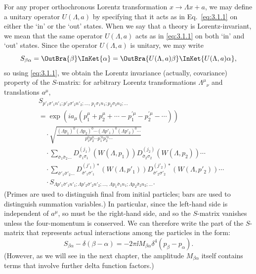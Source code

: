For any proper orthochronous Lorentz transformation $x\to\Lambda x+a$, we may
define a unitary operator $U(\Lambda,a)$ by specifying that it acts as in
Eq.~\eqref{eq:3.1.1} on either the `in' or the `out' states. When we say that a theory is
Lorentz-invariant, we mean that the same operator $U(\Lambda,a)$ acts as in
\eqref{eq:3.1.1} on both `in' and `out' states. Since the operator $U(\Lambda,a)$ is
unitary, we may write
\[
S_{\beta\alpha}=\OutBra{\beta}\InKet{\alpha}
=\OutBra{U(\Lambda,a)\beta}\InKet{U(\Lambda,a)\alpha},
\]
so using \eqref{eq:3.1.1}, we obtain the Lorentz invariance (actually, covariance)
property of the $S$-matrix: for arbitrary Lorentz transformations
$\Lambda^\mu{}_{\nu}$ and translations $a^\mu$,
\begin{align}
&S_{p'_1\sigma'_1n'_1;p'_2\sigma'_2n'_2;\ldots,\,
p_1\sigma_1n_1;p_2\sigma_2n_2;\ldots}
\nonumber\\
&=\exp\!\left(ia_\mu(p_1^\mu+p_2^\mu+\cdots-p_1^{\prime\mu}-p_2^{\prime\mu}-\cdots)\right)
\nonumber\\
&\quad\cdot\sqrt{\frac{(\Lambda p_1)^0(\Lambda p_2)^0\cdots
(\Lambda p'_1)^0(\Lambda p'_2)^0\cdots}
{p_1^0p_2^0\cdots p_1^{\prime0}p_2^{\prime0}\cdots}}
\nonumber\\
&\quad\cdot\sum_{\bar\sigma_1\bar\sigma_2\ldots}
D^{(j_1)}_{\bar\sigma_1\sigma_1}\!\left(W(\Lambda,p_1)\right)
D^{(j_2)}_{\bar\sigma_2\sigma_2}\!\left(W(\Lambda,p_2)\right)\cdots
\nonumber\\
&\quad\cdot\sum_{\bar\sigma'_1\bar\sigma'_2\ldots}
D^{(j'_1)*}_{\bar\sigma'_1\sigma'_1}\!\left(W(\Lambda,p'_1)\right)
D^{(j'_2)*}_{\bar\sigma'_2\sigma'_2}\!\left(W(\Lambda,p'_2)\right)\cdots
\nonumber\\
&\quad\cdot S_{\Lambda p'_1\bar\sigma'_1n'_1;\Lambda p'_2\bar\sigma'_2n'_2;\ldots,\,
\Lambda p_1\bar\sigma_1n_1;\Lambda p_2\bar\sigma_2n_2;\ldots}.
\tag{3.3.1}\label{eq:3.3.1}
\end{align}
(Primes are used to distinguish final from initial particles; bars are used to
distinguish summation variables.) In particular, since the left-hand side is
independent of $a^\mu$, so must be the right-hand side, and so the $S$-matrix
vanishes unless the four-momentum is conserved. We can therefore write the part
of the $S$-matrix that represents actual interactions among the particles in the
form:
\begin{equation}
S_{\beta\alpha}-\delta(\beta-\alpha)
=-2\pi \ii M_{\beta\alpha}\delta^4(p_\beta-p_\alpha).
\tag{3.3.2}\label{eq:3.3.2}
\end{equation}
(However, as we will see in the next chapter, the amplitude $M_{\beta\alpha}$
itself contains terms that involve further delta function factors.)

